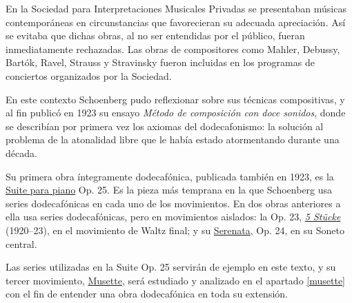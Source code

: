 En la Sociedad para Interpretaciones Musicales Privadas se presentaban m\'usicas contempor\'aneas en circunstancias que favorecieran su adecuada apreciaci\'on. As\'i se evitaba que dichas obras, al no ser entendidas por el p\'ublico, fueran inmediatamente rechazadas. Las obras de compositores como Mahler, Debussy, Bart\'ok, Ravel, Strauss y Stravinsky fueron incluidas en los programas de conciertos organizados por la Sociedad.

En este contexto Schoenberg pudo reflexionar sobre sus t\'ecnicas compositivas, y al fin public\'o en 1923 su ensayo \emph{M\'etodo de composici\'on con doce sonidos}, donde se describ\'ian por primera vez los axiomas del dodecafonismo: la soluci\'on al problema de la atonalidad libre que le hab\'ia estado atormentando durante una d\'ecada.

Su primera obra \'integramente dodecaf\'onica, publicada tambi\'en en 1923, es la \href{https://www.youtube.com/watch?v=bQHR_Z8XVvI}{Suite para piano} Op. 25. Es la pieza m\'as temprana en la que Schoenberg usa series dodecaf\'onicas en cada uno de los movimientos. En dos obras anteriores a ella usa series dodecaf\'onicas, pero en movimientos aislados: la Op. 23, \href{https://www.youtube.com/watch?v=7A9HSlgDlQE}{\emph{5 St\"ucke}} (1920--23), en el movimiento de Waltz final; y su \href{https://www.youtube.com/watch?v=fzAFalLbXxg}{Serenata}, Op. 24, en su Soneto central.

Las series utilizadas en la Suite Op. 25 servir\'an de ejemplo en este texto, y su tercer movimiento, \href{https://www.youtube.com/watch?v=scwNtGdop6w}{Musette}, ser\'a estudiado y analizado en el apartado \ref{musette} con el fin de entender una obra dodecaf\'onica en toda su extensi\'on.